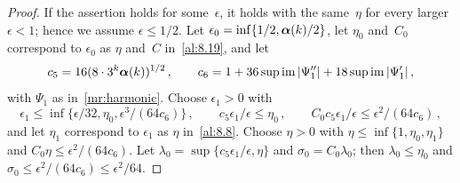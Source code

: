 \begin{proof}
    If the assertion holds for some~$\epsilon$, it holds with the same~$\eta$ for every larger
    $\epsilon < 1$; hence we assume $\epsilon \le 1/2$. Let $\epsilon_0 = \inf \{ 1/2,
    \boldsymbol{\alpha}(k)/2 \}$, let $\eta_0$ and~$C_0$ correspond to $\epsilon_0$ as $\eta$ and~$C$
    in~\ref{al:8.19}, and let
    \begin{displaymath}
        c_5 = 16 (8 \cdot 3^{k} \boldsymbol{\alpha}(k))^{1/2} \,, \qquad c_6 = 1 + 36 \sup \operatorname{im}
        |\Psi_1''| + 18 \sup \operatorname{im} |\Psi_1'| \,,
    \end{displaymath}
    with $\Psi_1$ as in~\ref{mr:harmonic}. Choose $\epsilon_1 > 0$ with
    \begin{displaymath}
        \epsilon_1 \le \inf \{ \epsilon/32, \eta_0, \epsilon^3 / (64 c_6) \} \,, \qquad c_5
        \epsilon_1 / \epsilon \le \eta_0 \,, \qquad C_0 c_5 \epsilon_1 / \epsilon \le \epsilon^2
        / (64 c_6) \,,
    \end{displaymath}
    and let $\eta_1$ correspond to $\epsilon_1$ as $\eta$ in~\ref{al:8.8}. Choose $\eta > 0$ with
    $\eta \le \inf \{ 1, \eta_0, \eta_1 \}$ and $C_0 \eta \le \epsilon^2 / (64 c_6)$. Let
    $\lambda_0 = \sup \{ c_5 \epsilon_1 / \epsilon, \eta \}$ and $\sigma_0 = C_0 \lambda_0$; then
    $\lambda_0 \le \eta_0$ and $\sigma_0 \le \epsilon^2 / (64 c_6) \le \epsilon^2 / 64$.


\end{proof}
